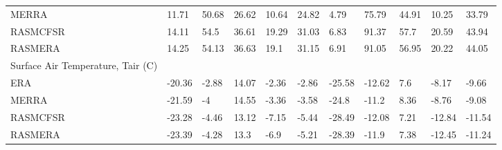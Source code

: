 \begin{table}[]
{\begin{tabular}{lllllllllll}
MERRA                                          & 11.71                        & 50.68  & 26.62  & 10.64  & 24.82  & 4.79   & 75.79  & 44.91  & 10.25  & 33.79  \\
RASMCFSR                                       & 14.11                        & 54.5   & 36.61  & 19.29  & 31.03  & 6.83   & 91.37  & 57.7   & 20.59  & 43.94  \\
RASMERA                                        & 14.25                        & 54.13  & 36.63  & 19.1   & 31.15  & 6.91   & 91.05  & 56.95  & 20.22  & 44.05  \\
Surface Air Temperature, Tair (C)              &                              &        &        &        &        &        &        &        &        &        \\
ERA                                            & -20.36                       & -2.88  & 14.07  & -2.36  & -2.86  & -25.58 & -12.62 & 7.6    & -8.17  & -9.66  \\
MERRA                                          & -21.59                       & -4     & 14.55  & -3.36  & -3.58  & -24.8  & -11.2  & 8.36   & -8.76  & -9.08  \\
RASMCFSR                                       & -23.28                       & -4.46  & 13.12  & -7.15  & -5.44  & -28.49 & -12.08 & 7.21   & -12.84 & -11.54 \\
RASMERA                                        & -23.39                       & -4.28  & 13.3   & -6.9   & -5.21  & -28.39 & -11.9  & 7.38   & -12.45 & -11.24
\end{tabular}
}
\end{table}

